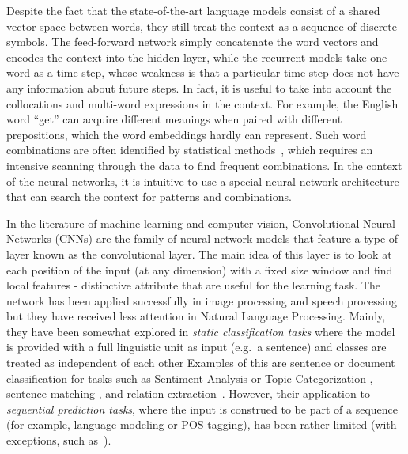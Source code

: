 Despite the fact that the state-of-the-art language models consist of a shared vector space between words, they still treat the context as a sequence of discrete symbols. The feed-forward network simply concatenate the word vectors and encodes the context into the hidden layer, while the recurrent models take one word as a time step, whose weakness is that a particular time step does not have any information about future steps. In fact, it is useful to take into account the collocations and multi-word expressions in the context. For example, the English word ``get'' can acquire different meanings when paired with different prepositions, which the word embeddings hardly can represent. Such word combinations are often identified by statistical methods~\cite{sag2002multiword}, which requires an intensive scanning through the data to find frequent combinations. In the context of the neural networks, it is intuitive to use a special neural network architecture that can search the context for patterns and combinations. 

In the literature of machine learning and computer vision, Convolutional Neural Networks (CNNs) are the family of neural network models that feature a type of layer known as the convolutional
layer. The main idea of this layer is to look at each position of the input (at any dimension) with a fixed size window and find local features - distinctive attribute that are useful for the learning task. The network has been applied successfully in image processing and speech processing~\cite{Gu:etal:2015} but they have received less attention in Natural Language Processing. Mainly, they have been somewhat explored in \emph{static classification tasks} where the model is provided with a
full linguistic unit as input (e.g.\ a sentence) and classes are
treated as independent of each other Examples of this are sentence or document classification for tasks such as Sentiment Analysis or Topic Categorization \cite{Kalchbrenner2014conv,kim2014sentence}, sentence matching \cite{hu2014convolutional}, and relation extraction~\cite{nguyen2015relation}. However, their application to \emph{sequential prediction tasks}, where the input is construed to be part of a sequence (for example, language modeling or POS tagging), has been rather limited (with exceptions, such as~). 


